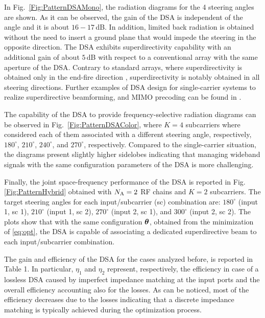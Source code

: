 \documentclass[10pt, final, twocolumn, twoside, romanappendices]{IEEEtran}
\begin{document}
In Fig.~\ref{Fig:PatternDSAMono}, the radiation diagrams for the 4 steering angles are shown.    
As it can be observed, the gain of the \ac{DSA} is independent of the angle and it is about $16-17\,$dB. In addition, limited back radiation is obtained without the need to insert a ground plane that would impede the steering in the opposite direction.
The \ac{DSA} exhibits superdirectivity capability with an additional gain of about $5\,$dB with respect to a conventional array with the same aperture of the  \ac{DSA}. 
Contrary to standard arrays, where superdirectivity is obtained only in the end-fire direction \cite{IvrNos:14}, superdirectivity is notably obtained in all steering directions.  Further examples of \ac{DSA} design for single-carrier systems to realize superdirective beamforming, and \ac{MIMO} precoding can be found in \cite{Dar:C24}. 
 
The capability of the \ac{DSA} to provide frequency-selective radiation diagrams can be observed in Fig.~\ref{Fig:PatternDSAColor}, where $K=4$ subcarriers where considered each of them associated with a different steering angle, respectively, $180^{\circ}$, $210^{\circ}$, $240^{\circ}$, and $270^{\circ}$, respectively. Compared to the single-carrier situation, the diagrams present slightly higher sidelobes indicating that managing wideband signals with the same configuration parameters of the \ac{DSA} is more challenging. 

Finally, the joint space-frequency performance of the \ac{DSA} is reported in Fig. \ref{Fig:PatternHybrid} obtained with $N_{\text{A}}=2$ \ac{RF} chains and   $K=2$ subcarriers. The target steering angles for each input/subcarrier (sc) combination are: $180^{\circ}$ (input 1, sc 1), $210^{\circ}$ (input 1, sc 2), $270^{\circ}$ (input 2, sc 1), and $300^{\circ}$ (input 2, sc 2). The plots show that with the same configuration $\boldsymbol{\theta}$, obtained from the minimization of \eqref{eq:opt}, the \ac{DSA} is capable of associating a dedicated superdirective beam to each input/subcarrier combination.

The gain and efficiency of the \ac{DSA} for the cases analyzed before, is reported in Table 1. In particular, $\eta_1$ and $\eta_2$ represent, respectively, the efficiency in case of a lossless \ac{DSA} caused by imperfect impedance matching at the input ports and the overall efficiency accounting also for the losses. As can be noticed, most of the efficiency decreases due to the losses indicating that a discrete impedance matching is typically achieved during the optimization process.      
\end{document}
